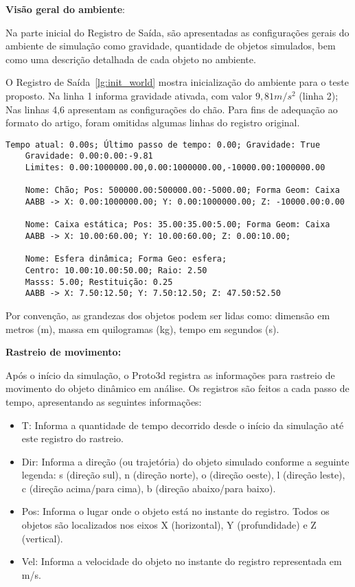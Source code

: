 \documentclass[12pt]{article}
\begin{document}
\noindent\textbf{Visão geral do ambiente}:  

Na parte inicial do Registro de Saída, são apresentadas as configurações gerais do ambiente de simulação como gravidade, quantidade de objetos simulados, bem como uma descrição detalhada de cada objeto no ambiente. 

O Registro de Saída~\ref{lg:init_world} mostra inicialização do ambiente para o teste proposto. Na linha 1 informa gravidade ativada, com valor $ 9,81 m/s^{2} $ (linha 2); Nas linhas 4,6 apresentam as configurações do chão. Para fins de adequação ao formato do artigo, foram omitidas algumas linhas do registro original. 

\begin{lstlisting}[frame=single,caption=Inicialização do ambiente\label{lg:init_world}]
	Tempo atual: 0.00s; Último passo de tempo: 0.00; Gravidade: True
	Gravidade: 0.00:0.00:-9.81
	Limites: 0.00:1000000.00,0.00:1000000.00,-10000.00:1000000.00
	
	Nome: Chão; Pos: 500000.00:500000.00:-5000.00; Forma Geom: Caixa
	AABB -> X: 0.00:1000000.00; Y: 0.00:1000000.00; Z: -10000.00:0.00 
	
	Nome: Caixa estática; Pos: 35.00:35.00:5.00; Forma Geom: Caixa
	AABB -> X: 10.00:60.00; Y: 10.00:60.00; Z: 0.00:10.00; 
	
	Nome: Esfera dinâmica; Forma Geo: esfera; 
	Centro: 10.00:10.00:50.00; Raio: 2.50
	Masss: 5.00; Restituição: 0.25
	AABB -> X: 7.50:12.50; Y: 7.50:12.50; Z: 47.50:52.50
\end{lstlisting}

Por convenção, as grandezas dos objetos podem ser lidas como: dimensão em metros (m), massa em quilogramas (kg), tempo em segundos (s).

\noindent\textbf{Rastreio de movimento:}

Após o início da simulação, o Proto3d registra as informações para rastreio de movimento do objeto dinâmico em análise. Os registros são feitos a cada passo de tempo, apresentando as seguintes informações:

\begin{itemize}
\item T: Informa a quantidade de tempo decorrido desde o início da simulação até este registro do rastreio.
\item Dir: Informa a direção (ou trajetória) do objeto simulado conforme a seguinte legenda: s (direção sul), n (direção norte), o (direção oeste), l (direção leste), c (direção acima/para cima), b (direção abaixo/para baixo).

\item Pos: Informa o lugar onde o objeto está no instante do registro. Todos os objetos são localizados nos eixos X (horizontal), Y (profundidade) e Z (vertical).

\item Vel: Informa a velocidade do objeto no instante do registro representada em m/s.
\end{itemize}
\end{document}
